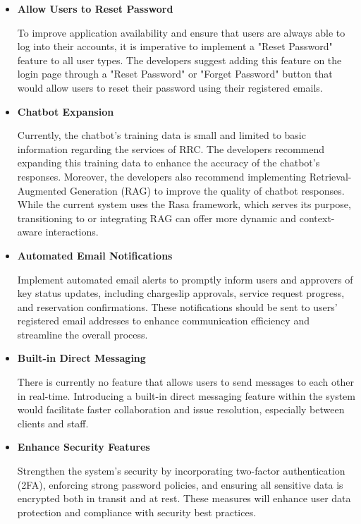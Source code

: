 \begin{itemize}
	
	\item \textbf{Allow Users to Reset Password}
	
	To improve application availability and ensure that users are always able to log into their accounts, it is imperative to implement a "Reset Password" feature to all user types. The developers suggest adding this feature on the login page through a "Reset Password" or "Forget Password" button that would allow users to reset their password using their registered emails.
	
	\item \textbf{Chatbot Expansion}
	
	Currently, the chatbot's training data is small and limited to basic information regarding the services of RRC. The developers recommend expanding this training data to enhance the accuracy of the chatbot's responses. Moreover, the developers also recommend implementing Retrieval-Augmented Generation (RAG) to improve the quality of chatbot responses. While the current system uses the Rasa framework, which serves its purpose, transitioning to or integrating RAG can offer more dynamic and context-aware interactions.
	
	\item \textbf{Automated Email Notifications}
	
	Implement automated email alerts to promptly inform users and approvers of key status updates, including chargeslip approvals, service request progress, and reservation confirmations. These notifications should be sent to users' registered email addresses to enhance communication efficiency and streamline the overall process.
	
	\item \textbf{Built-in Direct Messaging}
	
	There is currently no feature that allows users to send messages to each other in real-time. Introducing a built-in direct messaging feature within the system would facilitate faster collaboration and issue resolution, especially between clients and staff.
	
	\item \textbf{Enhance Security Features}
	
	Strengthen the system’s security by incorporating two-factor authentication (2FA), enforcing strong password policies, and ensuring all sensitive data is encrypted both in transit and at rest. These measures will enhance user data protection and compliance with security best practices.
	

\end{itemize}
